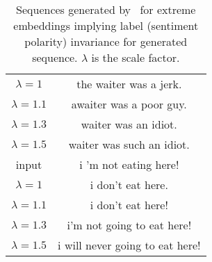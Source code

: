 \begin{table}[ht]
\begin{tabular}[t]{c|c}
\small $\lambda = 1$&	\small the waiter was a jerk. 	\\
\small $\lambda = 1.1$	&\small awaiter was a poor guy. \\
\small $\lambda = 1.3$&\small 	waiter was an idiot. \\
\small $\lambda = 1.5$&\small 	waiter was such an idiot. \\
\hline
\small input	&\small  i 'm not eating here! 	\\\hline
\small $\lambda = 1$&	\small i don't eat here. 	\\
\small $\lambda = 1.1$	&\small i don't eat here! 	 \\
\small $\lambda = 1.3$&\small 	i'm not going to eat here! 	 \\
\small $\lambda = 1.5$&\small 	i will never going to eat here! \\
\hline
\end{tabular}
\caption{Sequences generated by \geneliex\ for extreme embeddings implying label (sentiment polarity) invariance for generated sequence. $\lambda$ is the scale factor.}
\label{tab:additional_example_sentences}
\end{table}


